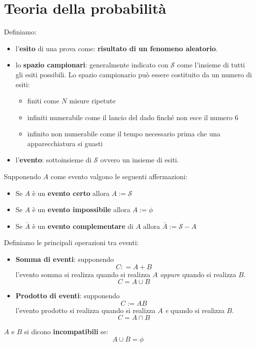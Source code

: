 \documentclass[11pt,a4paper]{book}
\begin{document}
\section{Teoria della probabilità} 
Definiamo:
\begin{itemize} 
\item l'\textbf{esito} di una prova come: \textbf{risultato di un fenomeno aleatorio}.
\item lo \textbf{spazio campionari}: generalmente indicato con $ \mathcal{S} $ come l'insieme di tutti gli esiti possibili. Lo spazio campionario può essere costituito da un numero di esiti: 
\begin{itemize}
\item finiti come $ N $ misure ripetute
\item infiniti numerabile come il lancio del dado finché non esce il numero $ 6 $
\item infinito non numerabile come il tempo necessario prima che una apparecchiatura si guasti
\end{itemize} 
\item l'\textbf{evento}: sottoinsieme di $ \mathcal{S} $ ovvero un insieme di esiti.
\end{itemize}
Supponendo $ A $ come evento valgono le seguenti affermazioni:
\begin{itemize} 
\item Se $ A $ è un \textbf{evento certo} allora $ A := \mathcal{S} $
\item Se $ A $ è un \textbf{evento impossibile} allora $ A := \phi $
\item Se $ \bar{A} $ è un \textbf{evento complementare} di $ A $ allora $ \bar{A}:= \mathcal{S}-A $
\end{itemize}
Definiamo le principali operazioni tra eventi:
\begin{itemize} 
\item \textbf{Somma di eventi}: supponendo 
\begin{equation}
C: = A+B
\end{equation} 
l'evento somma si realizza quando si realizza $ A $ \textit{oppure} quando si realizza $ B $.
\begin{equation}
C = A \cup B
\end{equation}
\item \textbf{Prodotto di eventi}: supponendo
\begin{equation}
C:= AB
\end{equation}
l'evento prodotto si realizza quando si realizza $ A $ \textit{e} quando si realizza $ B $.
\begin{equation}
C = A \cap B
\end{equation}

\end{itemize}
$ A $ e $ B $ si dicono \textbf{incompatibili} se: 
\begin{equation}
A \cup B = \phi
\end{equation}
\end{document}
